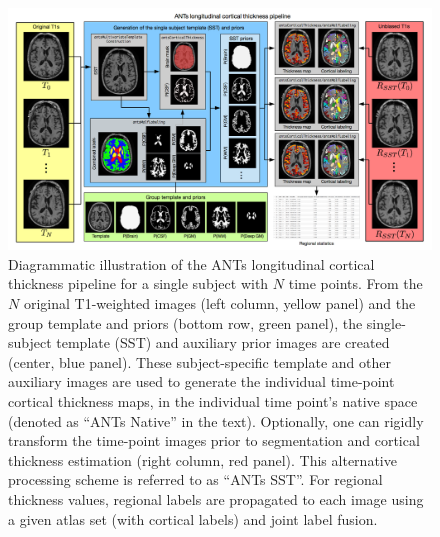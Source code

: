 \documentclass[11pt,table]{article}
\title{}
\author{}
\date{}
\begin{document}
\newpage

\begin{figure}
\centering
\includegraphics[width=\textwidth]{Figure3.pdf}
\caption{Diagrammatic illustration of the ANTs longitudinal cortical thickness pipeline
for a single subject with $N$ time points.  From the $N$ original T1-weighted
images (left column, yellow panel) and the group template and priors (bottom row,
green panel), the single-subject template (SST) and auxiliary prior images
are created (center, blue panel).  These subject-specific template and other
auxiliary images are used to generate the individual time-point cortical
thickness maps, in the individual time point's native space (denoted as
``ANTs Native'' in the text).  Optionally, one can
rigidly transform the time-point images prior to segmentation and cortical thickness
estimation (right column, red panel).  This alternative processing scheme is referred
to as ``ANTs SST''.  For regional thickness values, regional labels
are propagated to each image using a given atlas set (with cortical labels)
and joint label fusion.}
\label{fig:pipeline}
\end{figure}

\newpage
\end{document}
